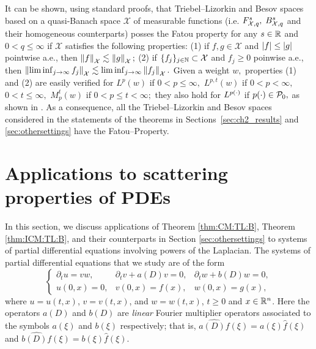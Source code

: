 It can be shown, using standard proofs, that Triebel--Lizorkin and Besov spaces based on a quasi-Banach space $\mathcal{X}$ of measurable functions (i.e. $\itl{\mathcal{X}}{s}{q},$ $\ibes{\mathcal{X}}{s}{q}$ and their homogeneous counterparts) posses the Fatou property for any $s\in \re$ and $0<q\le \infty$ if $\mathcal{X}$ satisfies the following properties: (1) if $f,g\in \mathcal{X}$ and $\abs{f}\le\abs{g}$ pointwise a.e., then $\norm{f}{\mathcal{X}}\lesssim \norm{g}{\mathcal{X}};$ (2) if $\{f_j\}_{j\in \na}\subset \mathcal{X}$ and $f_j\ge 0$ poinwise a.e., then $\norm{\liminf_{j\to\infty} f_j}{\mathcal{X}}\lesssim \liminf_{j\to\infty}\norm{f_j}{\mathcal{X}}.$ Given a weight $w,$  properties (1) and (2) are easily verified  for $L^p(w)$ if $0<p\le \infty,$ $L^{p,t}(w)$ if $0<p<\infty,$ $0<t\le \infty,$ $M^{t}_p(w)$ if $0<p\le t<\infty;$ they also hold for $L^{\pp}$ if $\pp\in \mathcal{P}_0,$ as shown in \cite[Theorem 2.61]{MR3026953}. As a consequence, all the Triebel--Lizorkin and Besov spaces considered in the statements of the theorems in Sections~\ref{sec:ch2_results} and \ref{sec:othersettings} have the Fatou--Property.


\section{Applications to scattering properties of PDEs}\label{ch2_applications}

In this section, we discuss applications of Theorem \ref{thm:CM:TL:B}, Theorem \ref{thm:ICM:TL:B}, and their counterparts in Section \ref{sec:othersettings} to systems of partial differential equations involving powers of the Laplacian. The systems of partial differential equations that we study are of the form
\begin{equation} \label{eq:a:b:}
\left\{ \begin{array}{lll}  \partial_t u =vw, & \partial_t v +a(D) v = 0, & \partial_t w + b(D) w = 0, \\
  u(0,x)=0,&v(0,x)=f(x),&w(0,x) = g(x),
 \end{array} \right.
\end{equation}
\noindent where $u=u(t,x)$, $v=v(t,x)$, and $w=w(t,x)$, $t\geq 0$ and $x\in\re^n$. Here the operators $a(D)$ and $b(D)$ are \textit{linear} Fourier multiplier operators associated to the symbols $a(\xi)$ and $b(\xi)$ respectively; that is, $\widehat{a(D)f}(\xi) = a(\xi)\widehat{f}(\xi)$ and $\widehat{b(D)f}(\xi) = b(\xi)\widehat{f}(\xi)$. 

